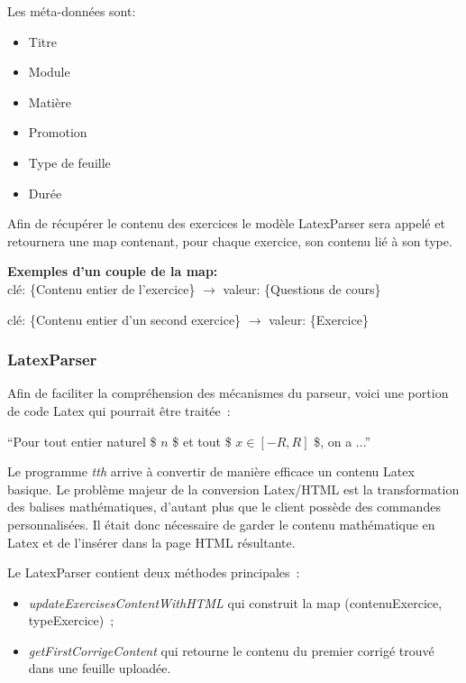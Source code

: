 Les méta-données sont: 
\begin{itemize}
\item Titre
\item Module
\item Matière
\item Promotion
\item Type de feuille
\item Durée\\
\end{itemize}

Afin de récupérer le contenu des exercices le modèle LatexParser sera appelé et retournera une map contenant, pour chaque exercice, son contenu lié à son type.
\begin{center}
\textbf{Exemples d'un couple de la map:\\}
clé: \{Contenu entier de l'exercice\} $\rightarrow$ valeur: \{Questions de cours\}
\end{center}
\vspace{-0.8cm}
\begin{center}
clé: \{Contenu entier d'un second exercice\} $\rightarrow$ valeur: \{Exercice\}
\end{center}

\subsubsection{LatexParser}

Afin de faciliter la compréhension des mécanismes du parseur, voici une portion de code Latex qui pourrait être traitée~:
\begin{center}
\enquote{Pour tout entier naturel \$ $n$ \$ et tout \$ $x \in [-R,R]$ \$, on a ...}
\end{center}

Le programme \emph{tth} arrive à convertir de manière efficace un contenu Latex basique. Le problème majeur de la conversion Latex/HTML est la transformation des balises mathématiques, d'autant plus que le client possède des commandes personnalisées.
Il était donc nécessaire de garder le contenu mathématique en Latex et de l'insérer dans la page HTML résultante.

Le LatexParser contient deux méthodes principales~:
\smallskip
\begin{itemize}
\item \textit{updateExercisesContentWithHTML} qui construit la map (contenuExercice, typeExercice)~;
\item \textit{getFirstCorrigeContent} qui retourne le contenu du premier corrigé trouvé dans une feuille uploadée.
\end{itemize}
\smallskip

